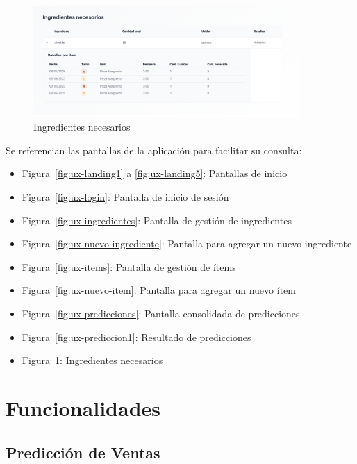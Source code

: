 \begin{figure}[htbp]
    \centering
    \includegraphics[width=0.9\textwidth]{images/prediccion2.png}
    \caption{Ingredientes necesarios}
    \label{fig:ux-prediccion2}
\end{figure}

Se referencian las pantallas de la aplicación para facilitar su consulta:
\begin{itemize}
    \item Figura~\ref{fig:ux-landing1} a \ref{fig:ux-landing5}: Pantallas de inicio
    \item Figura~\ref{fig:ux-login}: Pantalla de inicio de sesión
    \item Figura~\ref{fig:ux-ingredientes}: Pantalla de gestión de ingredientes
    \item Figura~\ref{fig:ux-nuevo-ingrediente}: Pantalla para agregar un nuevo ingrediente
    \item Figura~\ref{fig:ux-items}: Pantalla de gestión de ítems
    \item Figura~\ref{fig:ux-nuevo-item}: Pantalla para agregar un nuevo ítem
    \item Figura~\ref{fig:ux-predicciones}: Pantalla consolidada de predicciones
    \item Figura~\ref{fig:ux-prediccion1}: Resultado de predicciones
    \item Figura~\ref{fig:ux-prediccion2}: Ingredientes necesarios
\end{itemize}

\section{Funcionalidades}\label{sec:funcionalidades}

\subsection{Predicción de Ventas}\label{sec:prediccion-ventas}

